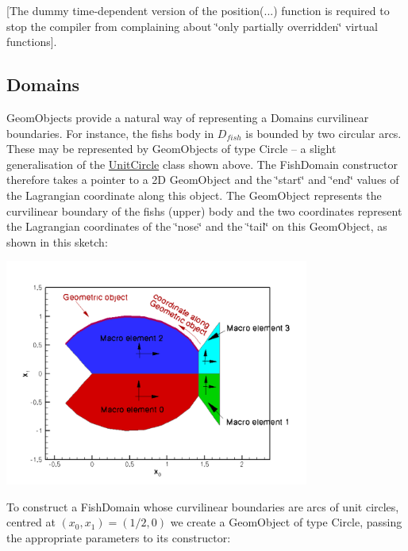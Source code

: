 \mbox{[}The dummy time-\/dependent version of the {\ttfamily position}(...) function is required to stop the compiler from complaining about \char`\"{}only partially 
overridden\char`\"{} virtual functions\mbox{]}.\hypertarget{index_domain_objects}{}\subsection{Domains}\label{index_domain_objects}
{\ttfamily Geom\+Objects} provide a natural way of representing a {\ttfamily Domain\textquotesingle{}s} curvilinear boundaries. For instance, the fish\textquotesingle{}s body in $ D_{fish}$ is bounded by two circular arcs. These may be represented by {\ttfamily Geom\+Objects} of type {\ttfamily Circle} -- a slight generalisation of the {\ttfamily \hyperlink{classUnitCircle}{Unit\+Circle}} class shown above. The {\ttfamily Fish\+Domain} constructor therefore takes a pointer to a 2D {\ttfamily Geom\+Object} and the \char`\"{}start\char`\"{} and \char`\"{}end\char`\"{} values of the Lagrangian coordinate along this object. The {\ttfamily Geom\+Object} represents the curvilinear boundary of the fish\textquotesingle{}s (upper) body and the two coordinates represent the Lagrangian coordinates of the \char`\"{}nose\char`\"{} and the \char`\"{}tail\char`\"{} on this {\ttfamily Geom\+Object}, as shown in this sketch\+:

 
\begin{DoxyImage}
\includegraphics[width=0.75\textwidth]{fish_domain}
\end{DoxyImage}


To construct a {\ttfamily Fish\+Domain} whose curvilinear boundaries are arcs of unit circles, centred at $ (x_0,x_1) = (1/2 , 0) $ we create a {\ttfamily Geom\+Object} of type {\ttfamily Circle}, passing the appropriate parameters to its constructor\+:


